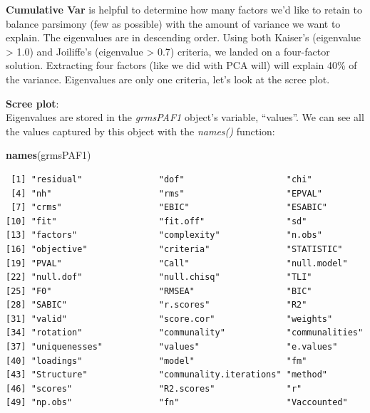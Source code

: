 \documentclass[
  english,
]{book}
\newenvironment{Shaded}{\begin{snugshade}}{\end{snugshade}}
\newcommand{\KeywordTok}[1]{\textcolor[rgb]{0.13,0.29,0.53}{\textbf{#1}}}
\newcommand{\NormalTok}[1]{#1}
\begin{document}
\textbf{Cumulative Var} is helpful to determine how many factors we'd like to retain to balance parsimony (few as possible) with the amount of variance we want to explain. The eigenvalues are in descending order. Using both Kaiser's (eigenvalue \textgreater{} 1.0) and Joiliffe's (eigenvalue \textgreater{} 0.7) criteria, we landed on a four-factor solution. Extracting four factors (like we did with PCA will) will explain 40\% of the variance. Eigenvalues are only one criteria, let's look at the scree plot.

\textbf{Scree plot}:\\
Eigenvalues are stored in the \emph{grmsPAF1} object's variable, ``values''. We can see all the values captured by this object with the \emph{names()} function:

\begin{Shaded}
\begin{Highlighting}[]
\KeywordTok{names}\NormalTok{(grmsPAF1)}
\end{Highlighting}
\end{Shaded}

\begin{verbatim}
 [1] "residual"               "dof"                    "chi"                   
 [4] "nh"                     "rms"                    "EPVAL"                 
 [7] "crms"                   "EBIC"                   "ESABIC"                
[10] "fit"                    "fit.off"                "sd"                    
[13] "factors"                "complexity"             "n.obs"                 
[16] "objective"              "criteria"               "STATISTIC"             
[19] "PVAL"                   "Call"                   "null.model"            
[22] "null.dof"               "null.chisq"             "TLI"                   
[25] "F0"                     "RMSEA"                  "BIC"                   
[28] "SABIC"                  "r.scores"               "R2"                    
[31] "valid"                  "score.cor"              "weights"               
[34] "rotation"               "communality"            "communalities"         
[37] "uniquenesses"           "values"                 "e.values"              
[40] "loadings"               "model"                  "fm"                    
[43] "Structure"              "communality.iterations" "method"                
[46] "scores"                 "R2.scores"              "r"                     
[49] "np.obs"                 "fn"                     "Vaccounted"            
\end{verbatim}
\end{document}

